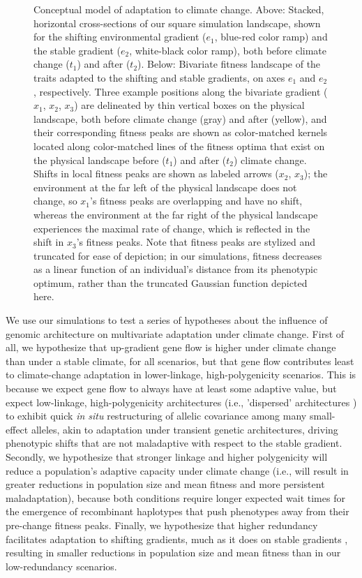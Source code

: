 \documentclass[9pt,twocolumn,twoside,lineno]{pnas-new}
\begin{document}
\begin{figure}
    \caption{Conceptual model of adaptation to climate change. Above: Stacked, horizontal cross-sections of our square simulation landscape, shown for the shifting environmental gradient ($e_{1}$, blue-red color ramp) and the stable gradient ($e_{2}$, white-black color ramp), both before climate change ($t_{1}$) and after ($t_{2}$). Below: Bivariate fitness landscape of the traits adapted to the shifting and stable gradients, on axes $e_{1}$ and $e_{2}$, respectively. Three example positions along the bivariate gradient ($x_{1}$, $x_{2}$, $x_{3}$) are delineated by thin vertical boxes on the physical landscape, both before climate change (gray) and after (yellow), and their corresponding fitness peaks are shown as color-matched kernels located along color-matched lines of the fitness optima that exist on the physical landscape before ($t_{1}$) and after ($t_{2}$) climate change. Shifts in local fitness peaks are shown as labeled arrows ($x_{2}$, $x_{3}$); the environment at the far left of the physical landscape does not change, so $x_{1}$'s fitness peaks are overlapping and have no shift, whereas the environment at the far right of the physical landscape experiences the maximal rate of change, which is reflected in the shift in $x_{3}$'s fitness peaks. Note that fitness peaks are stylized and truncated for ease of depiction; in our simulations, fitness decreases as a linear function of an individual's distance from its phenotypic optimum, rather than the truncated Gaussian function depicted here.}
\label{fig:fig_1}
\end{figure}


We use our simulations to test a series of hypotheses about the influence of genomic architecture 
on multivariate adaptation under climate change. First of all, we hypothesize that up-gradient 
gene flow is higher under climate change than under a stable climate, for all
scenarios, but that gene flow contributes least to climate-change adaptation in lower-linkage, 
high-polygenicity scenarios. This is because we expect gene flow to always have
at least some adaptive value, but expect low-linkage, high-polygenicity architectures 
(i.e., 'dispersed' architectures \cite{yeaman_review}) to exhibit quick \textit{in situ}
restructuring of allelic covariance among many small-effect alleles, akin to adaptation 
under transient genetic architectures, driving phenotypic shifts that are not maladaptive 
with respect to the stable gradient. Secondly, we hypothesize that stronger linkage 
and higher polygenicity will reduce a population's adaptive capacity under climate change
(i.e., will result in greater reductions in population size and mean fitness
and more persistent maladaptation), because both conditions require longer expected
wait times for the emergence of recombinant haplotypes that push phenotypes
away from their pre-change fitness peaks. Finally, we hypothesize that higher redundancy
facilitates adaptation to shifting gradients, much as it does on stable gradients 
\cite{barghi_redundancy,manceau,yeaman_amnat}, resulting in smaller reductions 
in population size and mean fitness than in our low-redundancy scenarios.
\end{document}
